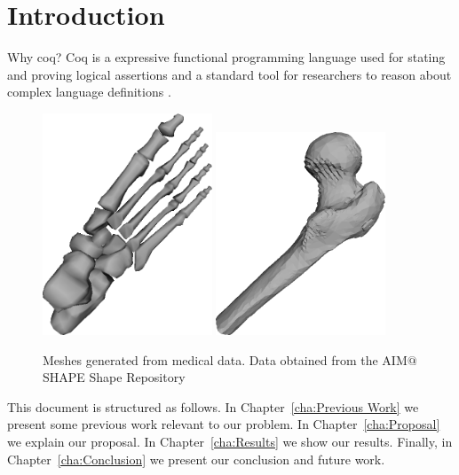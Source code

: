 
\chapter{Introduction}
Why coq? Coq is a expressive functional programming language used for stating and proving logical assertions and a standard tool for researchers to reason about complex language definitions \cite{Pierce:SF1}.


\begin{figure}
\centering
\includegraphics[width=0.45\textwidth]{pictures/image01.png}
\includegraphics[width=0.45\textwidth]{pictures/image02.png}
\caption{Meshes generated from medical data. Data obtained from the AIM$@$SHAPE Shape Repository \cite{AIMSHAPE}}
\label{fig:example}
\end{figure}


This document is structured as follows. In Chapter~\ref{cha:Previous Work} we present some previous work relevant to our problem. In Chapter~\ref{cha:Proposal} we explain our proposal. In Chapter~\ref{cha:Results} we show our results. Finally, in Chapter~\ref{cha:Conclusion} we present our conclusion and future work.



